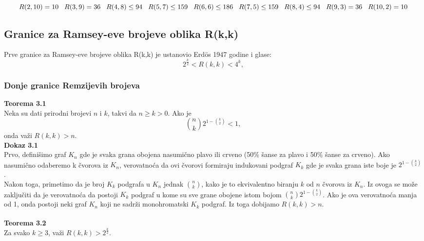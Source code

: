 \documentclass[12pt,a4paper]{article}
\begin{document}
\[R(2,10)=10\hspace{0.3cm}R(3,9)=36\hspace{0.3cm}R(4,8)\leq 94\hspace{0.3cm}R(5,7)\leq 159\hspace{0.3cm}R(6,6)\leq 186\hspace{0.3cm}R(7,5)\leq 159\hspace{0.3cm}R(8,4)\leq 94\hspace{0.3cm}R(9,3)=36\hspace{0.3cm}R(10,2)=10\]
\normalsize
\subsection{Granice za Ramsey-eve brojeve oblika R(k,k)}
Prve granice za Ramsey-eve brojeve oblika R(k,k) je ustanovio  Erd\"os 1947 godine i glase:
\[2^\frac{k}{2}<R(k,k)<4^k,\]

\subsubsection{Donje granice Remzijevih brojeva}
{\noindent\fontsize{12pt}{12pt}\textbf{Teorema 3.1}}\\
Neka su dati prirodni brojevi $n$ i $k$, takvi da $n\geq k>0$. Ako je
\[\binom{n}{k}2^{1-\binom{k}{2}}<1,\]
onda važi $R(k,k)>n$.\\

{\noindent\fontsize{12pt}{12pt}\textbf{Dokaz 3.1}} \\
Prvo, definišimo graf $K_n$ gde je svaka grana obojena nasumično plavo ili crveno (50\% šanse za plavo i 50\% šanse za crveno). Ako nasumično odaberemo k čvorova iz $K_n$, verovatnoća da ovi čvorovi formiraju indukovani podgraf $K_k$ gde je svaka grana iste boje je $2^{1-\binom{k}{2}}$.\\
Nakon toga, primetimo da je broj $K_k$ podgrafa u $K_n$ jednak $\binom{n}{k}$, kako je to ekvivalentno biranju $k$ od $n$ čvorova iz $K_n$. Iz ovoga se može zaključiti da je verovatnoća da postoji $K_k$ podgraf u kome su sve grane obojene istom bojom $\binom{n}{k}2^{1-\binom{k}{2}}$. Ako je ova verovatnoća manja od 1, onda postoji neki graf $K_n$ koji ne sadrži monohromatski $K_k$ podgraf. Iz toga dobijamo $R(k,k)>n$. \\ \\

{\noindent\fontsize{12pt}{12pt}\textbf{Teorema 3.2}} \\
Za svako $k\geq 3$, važi $R(k,k)>2^{\frac{k}{2}}$. \\
\end{document}
